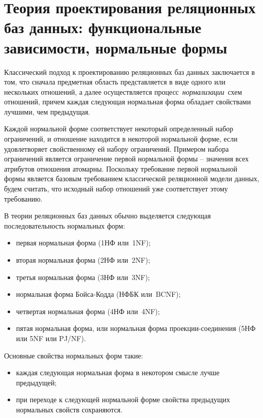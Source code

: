 \chapter{Теория проектирования реляционных баз данных: функциональные зависимости, нормальные формы}

Классический подход к проектированию реляционных баз данных заключается в том, что сначала предметная область представляется в виде одного или нескольких отношений, а далее осуществляется процесс \textit{нормализации} схем отношений, причем каждая следующая нормальная форма обладает свойствами лучшими, чем предыдущая.

Каждой нормальной форме соответствует некоторый определенный набор ограничений, и отношение находится в некоторой нормальной форме, если удовлетворяет свойственному ей набору ограничений. 
Примером набора ограничений является ограничение первой нормальной формы – значения всех атрибутов отношения атомарны. 
Поскольку требование первой нормальной формы является базовым требованием классической реляционной модели данных, будем считать, что исходный набор отношений уже соответствует этому требованию.

В теории реляционных баз данных обычно выделяется следующая последовательность нормальных форм:

\begin{itemize}[label*=--]
	\item первая нормальная форма (1НФ или 1NF);
	\item вторая нормальная форма (2НФ или 2NF);
	\item третья нормальная форма (3НФ или 3NF);
	\item нормальная форма Бойса-Кодда (НФБК или BCNF);
	\item четвертая нормальная форма (4НФ или 4NF);
	\item пятая нормальная форма, или нормальная форма проекции-соединения (5НФ или 5NF или PJ/NF).
\end{itemize}

\clearpage

Основные свойства нормальных форм такие:

\begin{itemize}[label*=--]
	\item каждая следующая нормальная форма в некотором смысле лучше предыдущей;
	\item при переходе к следующей нормальной форме свойства предыдущих нормальных свойств сохраняются.
\end{itemize}

